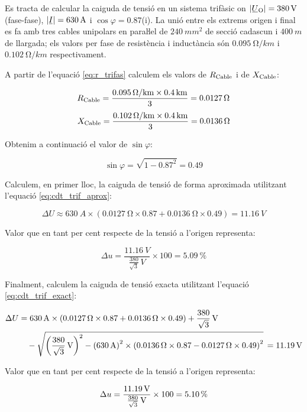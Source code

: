 \begin{exemple}\label{ex:CaigudaDeTensio}
	\addcontentsxms{\CaigudaDeTensio}
       Es tracta de calcular la caiguda de tensió en un sistema trifàsic on $|\cmplx{U}\ped{O}| = \qty{380}{V}$ (fase-fase), $|\cmplx{I}|=\qty{630}{A}$ i $\cos \varphi = \num{0,87}$(i). La unió entre els extrems origen  i final es fa amb tres cables unipolars en paraŀlel de $\qty{240}{mm^2}$ de secció cadascun i $\qty{400}{m}$ de llargada; els valors per fase de resistència i inductància són $\qty{0,095}{\ohm/km}$ i $\qty{0,102}{\ohm/km}$ respectivament.

    A partir de l'equació \eqref{eq:r_trifas} calculem els valors de $R_\mathrm{Cable}$ i de $X_\mathrm{Cable}$:

    \[
       R_\mathrm{Cable} = \frac{\qty{0,095}{\ohm/km}\times \qty{0,4}{km}}{3} = \qty{0,0127}{\ohm}
    \]
    \[
       X_\mathrm{Cable} = \frac{\qty{0,102}{\ohm/km}\times \qty{0,4}{km}}{3} = \qty{0,0136}{\ohm}
    \]

    Obtenim a continuació el valor de $\sin \varphi$:

    \[
       \sin \varphi = \sqrt{1-\num{0,87}^2} = \num{0,49}
    \]

    Calculem, en primer lloc, la caiguda de tensió de forma aproximada utilitzant l'equació \eqref{eq:cdt_trif_aprox}:

    \[
       \Delta U \approx \qty{630}{A} \times ( \qty{0,0127}{\ohm} \times \num{0,87} + \qty{0,0136}{\ohm} \times \num{0,49} ) = \qty{11,16}{V}
    \]

    Valor que en tant per cent respecte de la tensió a l'origen representa:

    \[
        \Delta u = \frac{\qty{11,16}{V}}{\frac{380}{\sqrt{3}}\unit{\,V}} \times 100 = \qty{5,09}{\percent}
    \]

    Finalment, calculem la caiguda de tensió exacta utilitzant l'equació \eqref{eq:cdt_trif_exact}:

    \[ \begin{split}
       \Delta U &=  \qty{630}{A} \times( \qty{0,0127}{\ohm} \times \num{0,87} + \qty{0,0136}{\ohm} \times \num{0,49}) + \qty[parse-numbers = false]{\frac{380}{\sqrt{3}}}{V}  \\
        & \quad - \sqrt{\left(\qty[parse-numbers = false]{\frac{380}{\sqrt{3}}}{V}\right)^2 - \left(\qty{630}{A}\right)^2 \times  \left( \qty{0,0136}{\ohm} \times \num{0,87} - \qty{0,0127}{\ohm} \times \num{0,49} \right)^2 } \,= \qty{11,19}{V}
    \end{split} \]

    Valor que en tant per cent respecte de la tensió a l'origen representa:

    \[
        \Delta u = \frac{\qty{11,19}{V}}{\qty[parse-numbers = false]{\frac{380}{\sqrt{3}}}{V}} \times 100 = \qty{5,10}{\percent}
    \]
\end{exemple}

